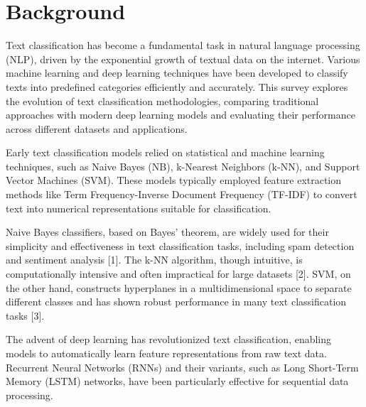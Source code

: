 \documentclass[conference]{IEEEtran}
\begin{document}

\section{Background}

Text classification has become a fundamental task in natural language processing (NLP), driven by the exponential growth of textual data on the internet. Various machine learning and deep learning techniques have been developed to classify texts into predefined categories efficiently and accurately. This survey explores the evolution of text classification methodologies, comparing traditional approaches with modern deep learning models and evaluating their performance across different datasets and applications.

Early text classification models relied on statistical and machine learning techniques, such as Naive Bayes (NB), k-Nearest Neighbors (k-NN), and Support Vector Machines (SVM). These models typically employed feature extraction methods like Term Frequency-Inverse Document Frequency (TF-IDF) to convert text into numerical representations suitable for classification.

Naive Bayes classifiers, based on Bayes' theorem, are widely used for their simplicity and effectiveness in text classification tasks, including spam detection and sentiment analysis [1]. The k-NN algorithm, though intuitive, is computationally intensive and often impractical for large datasets [2]. SVM, on the other hand, constructs hyperplanes in a multidimensional space to separate different classes and has shown robust performance in many text classification tasks [3].

The advent of deep learning has revolutionized text classification, enabling models to automatically learn feature representations from raw text data. Recurrent Neural Networks (RNNs) and their variants, such as Long Short-Term Memory (LSTM) networks, have been particularly effective for sequential data processing.
\end{document}
